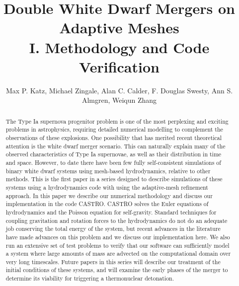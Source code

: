 \documentclass[iop]{emulateapj}
\begin{document}
\title{Double White Dwarf Mergers on Adaptive Meshes\\ I. Methodology and Code Verification}


\author{Max P. Katz, Michael Zingale, Alan C. Calder, F. Douglas Swesty, Ann S. Almgren, Weiqun Zhang}
\begin{abstract}
The Type Ia supernova progenitor problem is one of the most perplexing and 
exciting problems in astrophysics, requiring detailed numerical modelling to 
complement the observations of these explosions. One possibility that has 
merited recent theoretical attention is the white dwarf merger scenario.
This can naturally explain many of the observed characteristics of 
Type Ia supernovae, as well as their distribution in time and space.
However, to date there have been few fully self-consistent simulations 
of binary white dwarf systems using mesh-based hydrodynamics, 
relative to other methods. This is the first paper in a series designed to 
describe simulations of these systems using a hydrodynamics code with 
using the adaptive-mesh refinement approach. In this paper we describe our numerical 
methodology and discuss our implementation in the code CASTRO. CASTRO 
solves the Euler equations of hydrodynamics 
and the Poisson equation for self-gravity. Standard techniques for 
coupling gravitation and rotation forces to the hydrodynamics do 
not do an adequate job conserving the total energy of the system, 
but recent advances in the literature have made advances on this 
problem and we discuss our implementation here. We also run an 
extensive set of test problems to verify that our software can sufficiently
model a system where large amounts of mass are advected on the computational 
domain over very long timescales. Future papers in this series will describe
our treatment of the initial conditions of these systems, and will 
examine the early phases of the merger to determine its viability
for triggering a thermonuclear detonation.

\end{abstract}
\end{document}
